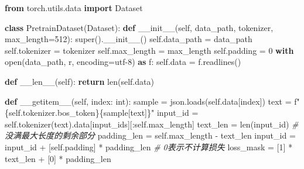 \documentclass[
]{article}
\newenvironment{Shaded}{}{}
\newcommand{\BuiltInTok}[1]{\textcolor[rgb]{0.00,0.50,0.00}{#1}}
\newcommand{\CommentTok}[1]{\textcolor[rgb]{0.38,0.63,0.69}{\textit{#1}}}
\newcommand{\ControlFlowTok}[1]{\textcolor[rgb]{0.00,0.44,0.13}{\textbf{#1}}}
\newcommand{\DecValTok}[1]{\textcolor[rgb]{0.25,0.63,0.44}{#1}}
\newcommand{\FunctionTok}[1]{\textcolor[rgb]{0.02,0.16,0.49}{#1}}
\newcommand{\ImportTok}[1]{\textcolor[rgb]{0.00,0.50,0.00}{\textbf{#1}}}
\newcommand{\KeywordTok}[1]{\textcolor[rgb]{0.00,0.44,0.13}{\textbf{#1}}}
\newcommand{\NormalTok}[1]{#1}
\newcommand{\OperatorTok}[1]{\textcolor[rgb]{0.40,0.40,0.40}{#1}}
\newcommand{\SpecialCharTok}[1]{\textcolor[rgb]{0.25,0.44,0.63}{#1}}
\newcommand{\SpecialStringTok}[1]{\textcolor[rgb]{0.73,0.40,0.53}{#1}}
\newcommand{\StringTok}[1]{\textcolor[rgb]{0.25,0.44,0.63}{#1}}
\newcommand{\VariableTok}[1]{\textcolor[rgb]{0.10,0.09,0.49}{#1}}
\begin{document}
\begin{Shaded}
\begin{Highlighting}[]
\ImportTok{from}\NormalTok{ torch.utils.data }\ImportTok{import}\NormalTok{ Dataset}

\KeywordTok{class}\NormalTok{ PretrainDataset(Dataset):}
    \KeywordTok{def} \FunctionTok{\_\_init\_\_}\NormalTok{(}\VariableTok{self}\NormalTok{, data\_path, tokenizer, max\_length}\OperatorTok{=}\DecValTok{512}\NormalTok{):}
        \BuiltInTok{super}\NormalTok{().}\FunctionTok{\_\_init\_\_}\NormalTok{()}
        \VariableTok{self}\NormalTok{.data\_path }\OperatorTok{=}\NormalTok{ data\_path}
        \VariableTok{self}\NormalTok{.tokenizer }\OperatorTok{=}\NormalTok{ tokenizer}
        \VariableTok{self}\NormalTok{.max\_length }\OperatorTok{=}\NormalTok{ max\_length}
        \VariableTok{self}\NormalTok{.padding }\OperatorTok{=} \DecValTok{0}
        \ControlFlowTok{with} \BuiltInTok{open}\NormalTok{(data\_path, }\StringTok{\textquotesingle{}r\textquotesingle{}}\NormalTok{, encoding}\OperatorTok{=}\StringTok{\textquotesingle{}utf{-}8\textquotesingle{}}\NormalTok{) }\ImportTok{as}\NormalTok{ f:}
            \VariableTok{self}\NormalTok{.data }\OperatorTok{=}\NormalTok{ f.readlines()}

    \KeywordTok{def} \FunctionTok{\_\_len\_\_}\NormalTok{(}\VariableTok{self}\NormalTok{):}
        \ControlFlowTok{return} \BuiltInTok{len}\NormalTok{(}\VariableTok{self}\NormalTok{.data)}

    \KeywordTok{def} \FunctionTok{\_\_getitem\_\_}\NormalTok{(}\VariableTok{self}\NormalTok{, index: }\BuiltInTok{int}\NormalTok{):}
\NormalTok{        sample }\OperatorTok{=}\NormalTok{ json.loads(}\VariableTok{self}\NormalTok{.data[index])}
\NormalTok{        text }\OperatorTok{=} \SpecialStringTok{f"}\SpecialCharTok{\{}\VariableTok{self}\SpecialCharTok{.}\NormalTok{tokenizer}\SpecialCharTok{.}\NormalTok{bos\_token}\SpecialCharTok{\}\{}\NormalTok{sample[}\StringTok{\textquotesingle{}text\textquotesingle{}}\NormalTok{]}\SpecialCharTok{\}}\SpecialStringTok{"}
\NormalTok{        input\_id }\OperatorTok{=} \VariableTok{self}\NormalTok{.tokenizer(text).data[}\StringTok{\textquotesingle{}input\_ids\textquotesingle{}}\NormalTok{][:}\VariableTok{self}\NormalTok{.max\_length]}
\NormalTok{        text\_len }\OperatorTok{=} \BuiltInTok{len}\NormalTok{(input\_id)}
        \CommentTok{\# 没满最大长度的剩余部分}
\NormalTok{        padding\_len }\OperatorTok{=} \VariableTok{self}\NormalTok{.max\_length }\OperatorTok{{-}}\NormalTok{ text\_len}
\NormalTok{        input\_id }\OperatorTok{=}\NormalTok{ input\_id }\OperatorTok{+}\NormalTok{ [}\VariableTok{self}\NormalTok{.padding] }\OperatorTok{*}\NormalTok{ padding\_len}
        \CommentTok{\# 0表示不计算损失}
\NormalTok{        loss\_mask }\OperatorTok{=}\NormalTok{ [}\DecValTok{1}\NormalTok{] }\OperatorTok{*}\NormalTok{ text\_len }\OperatorTok{+}\NormalTok{ [}\DecValTok{0}\NormalTok{] }\OperatorTok{*}\NormalTok{ padding\_len}


\end{Highlighting}
\end{Shaded}
\end{document}
